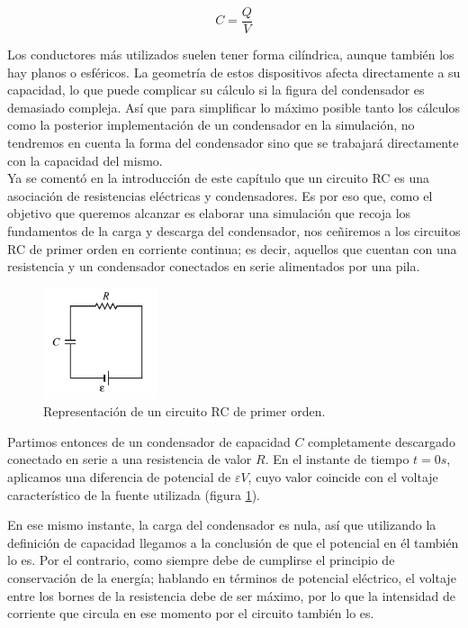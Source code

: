 \documentclass[../main.tex]{subfiles}
\begin{document}
\begin{equation}
    \label{def::capacidad_conductor}
    C = \frac{Q}{V}
\end{equation}

Los conductores más utilizados suelen tener forma cilíndrica, aunque también los hay planos o esféricos. La geometría de estos dispositivos afecta directamente a su capacidad, lo que puede complicar su cálculo si la figura del condensador es demasiado compleja. Así que para simplificar lo máximo posible tanto los cálculos como la posterior implementación de un condensador en la simulación, no tendremos en cuenta la forma del condensador sino que se trabajará directamente con la capacidad del mismo.\\ 

Ya se comentó en la introducción de este capítulo que un circuito RC es una asociación de resistencias eléctricas y condensadores. Es por eso que, como el objetivo que queremos alcanzar es elaborar una simulación que recoja los fundamentos de la carga y descarga del condensador, nos ceñiremos a los circuitos RC de primer orden en corriente continua; es decir, aquellos que cuentan con una resistencia y un condensador conectados en serie alimentados por una pila.\\ 

\begin{figure}[!h]
    \centering
    \includegraphics[width=0.3\textwidth]{images/Circuito_RC.png}
    \caption{Representación de un circuito RC de primer orden.}
    \label{fig::circuito_rc_representación}
\end{figure}

Partimos entonces de un condensador de capacidad $C$ completamente descargado conectado en serie a una resistencia de valor $R$. En el instante de tiempo $t=0s$, aplicamos una diferencia de potencial de $\varepsilon V$, cuyo valor coincide con el voltaje característico de la fuente utilizada (figura \ref{fig::circuito_rc_representación}).

En ese mismo instante, la carga del condensador es nula, así que utilizando la definición de capacidad llegamos a la conclusión de que el potencial en él también lo es. Por el contrario, como siempre debe de cumplirse el principio de conservación de la energía; hablando en términos de potencial eléctrico, el voltaje entre los bornes de la resistencia debe de ser máximo, por lo que la intensidad de corriente que circula en ese momento por el circuito también lo es. 
\end{document}
